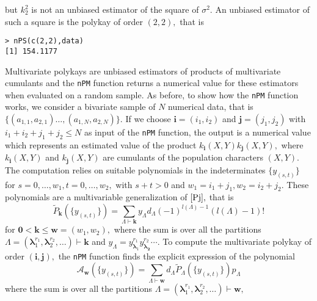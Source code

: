 \hskip-0.5cm but \(k_2^2\) is not an unbiased estimator of the square of
\(\sigma^2.\) An unbiased estimator of such a square is the polykay of
order \((2,2),\) that is

\begin{verbatim}
> nPS(c(2,2),data)
[1] 154.1177
\end{verbatim}

Multivariate polykays are unbiased estimators of products of
multivariate cumulants and the \texttt{nPM} function returns a numerical
value for these estimators when evaluated on a random sample. As before,
to show how the \texttt{nPM} function works, we consider a bivariate
sample of \(N\) numerical data, that is
\(\{(a_{1,1},a_{2,1}) \ldots, (a_{1,N},a_{2,N})\}.\) If we choose
\(\boldsymbol{i}=(i_1, i_2)\) and \(\boldsymbol{j}=(j_1, j_2)\) with
\(i_1 + i_2 + j_1 + j_2 \leq N\) as input of the \texttt{nPM} function,
the output is a numerical value which represents an estimated value of
the product \(k_{\boldsymbol{i}}(X,Y) k_{\boldsymbol{j}}(X,Y),\) where
\(k_{\boldsymbol{i}}(X,Y)\) and \(k_{\boldsymbol{j}}(X,Y)\) are
cumulants of the population characters \((X,Y).\) The computation relies
on suitable polynomials in the indeterminates \(\{y_{(s,t)}\}\) for
\(s=0,\ldots, w_1, t=0,\ldots, w_2,\) with \(s+t>0\) and
\(w_1=i_1+j_1, w_2=i_2+j_2.\) These polynomials are a multivariable
generalization of \(\eqref{Pj},\) that is \begin{equation}\label{Pjm}
\tilde{P}_{\boldsymbol{k}}\left( \{y_{(s,t)}\} \right)  =  \sum_{\Lambda \vdash \boldsymbol{k}} 
y_{\Lambda} d_{\Lambda} (-1)^{l(\Lambda)-1} (l(\Lambda)-1)!
\end{equation} for
\(\boldsymbol{0} < \boldsymbol{k} \leq \boldsymbol{w}=(w_1,w_2),\) where
the sum is over all the partitions
\(\Lambda=(\boldsymbol{\lambda}_1^{r_1}, \boldsymbol{\lambda}_2^{r_2},\ldots) \vdash \boldsymbol{k}\)
and
\(y_{\Lambda} = y_{\boldsymbol{\lambda}_1}^{r_1} y_{\boldsymbol{\lambda_2}}^{r_2} \cdots.\)
To compute the multivariate polykay of order
\((\boldsymbol{i}, \boldsymbol{j}),\) the \texttt{nPM} function finds
the explicit expression of the polynomial \begin{equation}\label{Ai}
{\mathcal A}_{\boldsymbol{w}} \left( \{y_{(s,t)}\} \right) =  \sum_{\Lambda \vdash \boldsymbol{w}} d_{\Lambda}  \tilde{P}_{\Lambda}\left( \{y_{(s,t)}\} \right) p_{\Lambda} 
\end{equation} where the sum is over all the partitions
\(\Lambda=(\boldsymbol{\lambda}_1^{r_1}, \boldsymbol{\lambda}_2^{r_2},\ldots) \vdash \boldsymbol{w},\)
